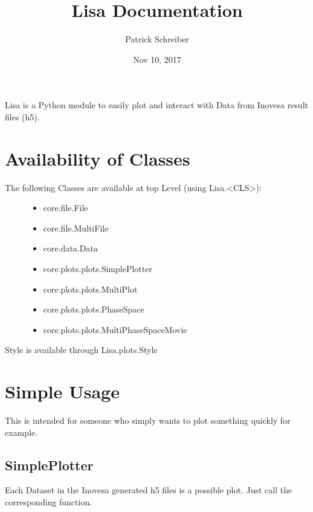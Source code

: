 \documentclass[letterpaper,10pt,openany,oneside,english]{sphinxmanual}
\title{Lisa Documentation}
\date{Nov 10, 2017}
\author{Patrick Schreiber}
\begin{document}
\maketitle
\sphinxtableofcontents
{}\label{\detokenize{index::doc}}


Lisa is a Python module to easily plot and interact with Data from Inovesa result files (h5).


\chapter{Availability of Classes}
\label{\detokenize{availability::doc}}\label{\detokenize{availability:availability-of-classes}}\label{\detokenize{availability:welcome-to-lisa-s-documentation}}\begin{description}
\item[{The following Classes are available at top Level (using Lisa.\textless{}CLS\textgreater{}):}] \leavevmode\begin{itemize}
\item {} 
core.file.File

\item {} 
core.file.MultiFile

\item {} 
core.data.Data

\item {} 
core.plots.plots.SimplePlotter

\item {} 
core.plots.plots.MultiPlot

\item {} 
core.plots.plots.PhaseSpace

\item {} 
core.plots.plots.MultiPhaseSpaceMovie

\end{itemize}

\end{description}

Style is available through Lisa.plots.Style


\chapter{Simple Usage}
\label{\detokenize{simpleusage::doc}}\label{\detokenize{simpleusage:simple-usage}}
This is intended for someone who simply wants to plot something quickly for example.


\section{SimplePlotter}
\label{\detokenize{simpleusage:simpleplotter}}
Each Dataset in the Inovesa generated h5 files is a possible plot. Just call the corresponding function.
\end{document}
